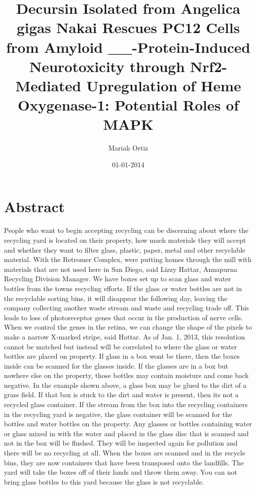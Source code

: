 \documentclass{article}%
\title{Decursin Isolated from Angelica gigas Nakai Rescues PC12 Cells from Amyloid \_\_{-}Protein{-}Induced Neurotoxicity through Nrf2{-}Mediated Upregulation of Heme Oxygenase{-}1: Potential Roles of MAPK}%
\author{Mariah Ortiz}%
\affil{Departamento de Infectmica y Patognesis Molecular, Centro de Investigacin y de Estudios Avanzados del IPN (CINVESTAV{-}IPN), 07360 Mxico, DF, Mexico}%
\date{01{-}01{-}2014}%
\begin{document}
%
\normalsize%
\maketitle%
\section{Abstract}%
\label{sec:Abstract}%
People who want to begin accepting recycling can be discerning about where the recycling yard is located on their property, how much materials they will accept and whether they want to filter glass, plastic, paper, metal and other recyclable material.\newline%
With the Retromer Complex, were putting homes through the mill with materials that are not used here in San Diego, said Lizzy Hattar, Annapurna Recycling Division Manager. We have boxes set up to scan glass and water bottles from the towns recycling efforts.\newline%
If the glass or water bottles are not in the recyclable sorting bins, it will disappear the following day, leaving the company collecting another waste stream and waste and recycling trade off. This leads to loss of photoreceptor genes that occur in the production of nerve cells.\newline%
When we control the genes in the retina, we can change the shape of the pixels to make a narrow X{-}marked stripe, said Hattar.\newline%
As of Jan. 1, 2013, this resolution cannot be matched but instead will be correlated to where the glass or water bottles are placed on property. If glass in a box wont be there, then the boxes inside can be scanned for the glasses inside. If the glasses are in a box but nowhere else on the property, those bottles may contain moisture and come back negative.\newline%
In the example shown above, a glass box may be glued to the dirt of a grass field. If that box is stuck to the dirt and water is present, then its not a recycled glass container. If the stream from the box into the recycling containers in the recycling yard is negative, the glass container will be scanned for the bottles and water bottles on the property.\newline%
Any glasses or bottles containing water or glass mixed in with the water and placed in the glass disc that is scanned and not in the box will be flushed. They will be inspected again for pollution and there will be no recycling at all.\newline%
When the boxes are scanned and in the recycle bins, they are now containers that have been transposed onto the landfills. The yard will take the boxes off of their lands and throw them away. You can not bring glass bottles to this yard because the glass is not recyclable.
\end{document}
